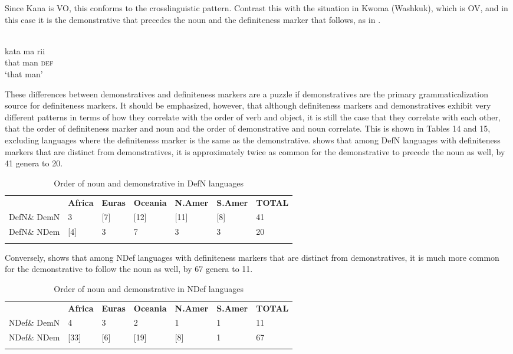 \documentclass[output=paper]{langsci/langscibook}
\begin{document}
Since Kana is VO, this conforms to the crosslinguistic pattern. Contrast this with the situation in Kwoma (Washkuk), which is OV, and in this case it is the demonstrative that precedes the noun and the definiteness marker that follows, as in .

\ea\label{ex:dryer:}
\\
\gll   kata  ma  rii\\
       that  man  \textsc{def}\\
\glt   ‘that man’
\z

These differences between demonstratives and definiteness markers are a puzzle if demonstratives are the primary grammaticalization source for definiteness markers. It should be emphasized, however, that although definiteness markers and demonstratives exhibit very different patterns in terms of how they correlate with the order of verb and object, it is still the case that they correlate with each other, that the order of definiteness marker and noun and the order of demonstrative and noun correlate. This is shown in Tables 14 and 15, excluding languages where the definiteness marker is the same as the demonstrative.  shows that among DefN languages with definiteness markers that are distinct from demonstratives, it is approximately twice as common for the demonstrative to precede the noun as well, by 41 genera to 20.

\begin{table}
\begin{tabularx}{\textwidth}{XXXXXXX}
\lsptoprule
& \bfseries Africa & \bfseries Euras & \bfseries Oceania & \bfseries N.Amer & \bfseries S.Amer & \bfseries TOTAL\\
DefN\& DemN & 3 & [7] & [12] & [11] & [8] & 41\\
DefN\& NDem & [4] & 3 & 7 & 3 & 3 & 20\\
\lspbottomrule
\end{tabularx}
\caption{\label{tab:dryer:14}Order of noun and demonstrative in DefN languages}
\end{table}

Conversely,  shows that among NDef languages with definiteness markers that are distinct from demonstratives, it is much more common for the demonstrative to follow the noun as well, by 67 genera to 11.

\begin{table}
\begin{tabularx}{\textwidth}{XXXXXXX}
& \bfseries Africa & \bfseries Euras & \bfseries Oceania & \bfseries N.Amer & \bfseries S.Amer & \bfseries TOTAL\\
\lsptoprule
NDef\& DemN & 4 & 3 & 2 & 1 & 1 & 11\\
NDef\& NDem & [33] & [6] & [19] & [8] & 1 & 67\\
\lspbottomrule
\end{tabularx}
\caption{\label{tab:dryer:15}Order of noun and demonstrative in NDef languages}
\end{table}
\end{document}
